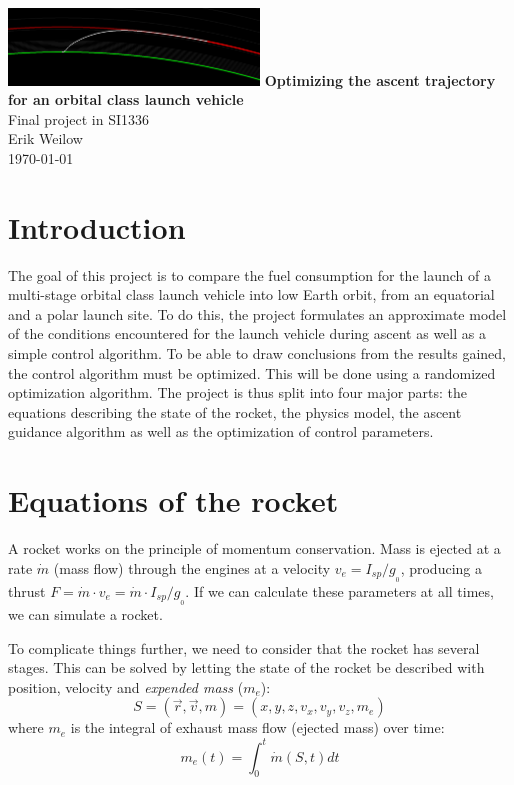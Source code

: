 \documentclass[11pt]{article}
\begin{document}
\begin{titlepage}
  \centering
  \vfill
  \vfill
  \includegraphics[width=0.5\textwidth]{./220km.png}
  \vskip3cm
  {\Large
  \textbf{Optimizing the ascent trajectory for an orbital class launch vehicle}\\
  \vskip0.25cm
  Final project in SI1336\\
      \vskip1cm
      Erik Weilow\\
      \vskip0.5cm
      \today\\
  }    
  \vfill
  \vfill
\end{titlepage}
\newpage

\section{Introduction}
The goal of this project is to compare the fuel consumption for the launch of a multi-stage orbital class launch vehicle into low Earth orbit, from an equatorial and a polar launch site.
To do this, the project formulates an approximate model of the conditions encountered for the launch vehicle during ascent as well as a simple control algorithm.
To be able to draw conclusions from the results gained, the control algorithm must be optimized. 
This will be done using a randomized optimization algorithm.
The project is thus split into four major parts: the equations describing the state of the rocket, the physics model, the ascent guidance algorithm as well as the optimization of control parameters.

\section{Equations of the rocket}
A rocket works on the principle of momentum conservation. Mass is ejected at a rate $\dot{m}$ (mass flow) through the engines at a velocity $v_{e} = I_{sp} / g_{_0}$, 
producing a thrust $F = \dot{m} \cdot v_{e} = \dot{m} \cdot I_{sp} / g_{_0}$. If we can calculate these parameters at all times, we can simulate a rocket.

To complicate things further, we need to consider that the rocket has several stages.
This can be solved by letting the state of the rocket be described with position, velocity and \textit{expended mass} ($m_e$):
$$
S = (\vec{r}, \vec{v}, m) = (x, y, z, v_x, v_y, v_z, m_e)
$$
where $m_e$ is the integral of exhaust mass flow (ejected mass) over time:
$$
m_e(t) = \int_0^t \dot{m}(S,t) dt
$$
\end{document}
